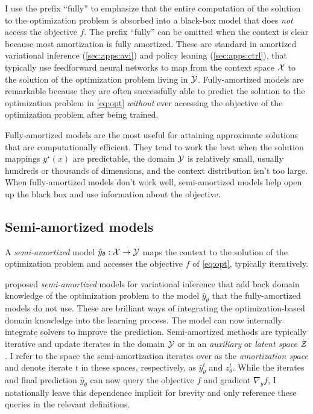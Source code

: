 I use the prefix ``fully'' to emphasize
that the entire computation of the solution to the
optimization problem is absorbed into
a black-box model that does \emph{not} access the objective $f$.
The prefix ``fully'' can be omitted when the context is clear
because most amortization is fully amortized.
These are standard in amortized variational inference
(\cref{sec:apps:avi}) and policy
leaning (\cref{sec:apps:ctrl}), that typically use
feedforward neural networks to map from
the context space ${\mathcal{X}}$ to the solution of the
optimization problem living in ${\mathcal{Y}}$.
Fully-amortized models are remarkable because they
are often successfully able to predict the solution
to the optimization problem in \cref{eq:opt}
\emph{without} ever accessing the objective of
the optimization problem after being trained.

Fully-amortized models are the most useful for attaining approximate
solutions that are computationally efficient.
They tend to work the best when the
solution mappings $y^\star(x)$ are predictable,
the domain ${\mathcal{Y}}$ is relatively small,
usually hundreds or thousands of dimensions,
and the context distribution isn't too large.
When fully-amortized models don't work well,
semi-amortized models help open up the black box
and use information about the objective.

\subsection{Semi-amortized models}
\label{sec:model:semi}
\begin{definition}
  A \emph{semi-amortized} model $\hat y_\theta: {\mathcal{X}}\rightarrow{\mathcal{Y}}$
  maps the context to the solution of the optimization problem
  and accesses the objective $f$ of \cref{eq:opt},
  typically iteratively.
\end{definition}

\citet{kim2018semi,marino2018iterative}
proposed \emph{semi-amortized} models for variational inference
that add back domain knowledge of the optimization problem
to the model $\hat y_\theta$ that the fully-amortized
models do not use.
These are brilliant ways of integrating the optimization-based
domain knowledge into the learning process.
The model can now internally integrate
solvers to improve the prediction.
Semi-amortized methods are typically iterative and update
iterates in the domain ${\mathcal{Y}}$ or in an \emph{auxiliary}
or \emph{latent space} ${\mathcal{Z}}$.
I refer to the space the semi-amortization iterates over
as the \emph{amortization space} and denote iterate $t$
in these spaces, respectively, as $\hat y^{t}_\theta$ and $z^t_\theta$.
While the iterates and final prediction $\hat y_\theta$
can now query the objective $f$ and gradient $\nabla_y f$,
I notationally leave this dependence implicit for
brevity and only reference these queries in the relevant definitions.

